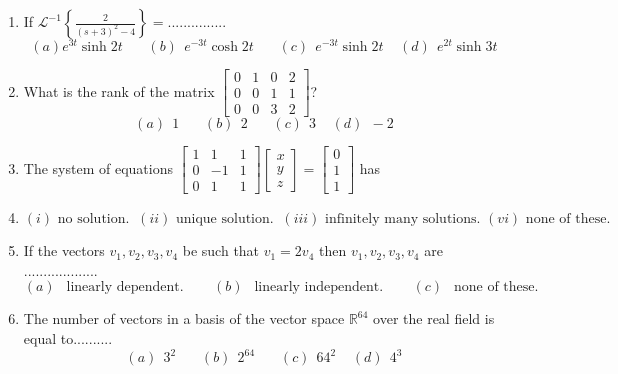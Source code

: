 \documentclass[a4paper,12pt]{article}
\begin{document}
\begin{enumerate}
 \item If ${\mathcal L}^{-1}\left\{\displaystyle\frac{2}{(s+3)^2-4}\right\}=...............$
\vspace{10pt}
  $$(a) e^{3t}\sinh 2t ~~~~~~~~(b)~~e^{-3t}\cosh 2t ~~~~~~~~(c)~~e^{-3t}\sinh 2t ~~~~~(d)~~e^{2t}\sinh 3t $$

 \item What is the rank of the matrix $\begin{bmatrix}
                               0 & 1 & 0 & 2\\ 0 & 0 & 1 & 1\\0 & 0 & 3 & 2
                               \end{bmatrix}$?
 \vspace{10pt}
 $$(a)~~ 1 ~~~~~~~~(b)~~2 ~~~~~~~~(c)~~3 ~~~~~(d)~~-2 $$

\item The system of equations $\begin{bmatrix}
                               1 & 1 & 1\\ 0 & -1 & 1\\0 & 1 & 1
                               \end{bmatrix}\begin{bmatrix}x\\ y\\z
                               \end{bmatrix}=\begin{bmatrix}0 \\ 1\\ 1
                               \end{bmatrix}$ has  \item[] 
                               $$ (i) \text{ no solution. }~(ii) \text{  unique solution. }~(iii) \text{ infinitely many solutions. }
                               (vi) \text{ none of these.}$$
\item If the vectors $v_1,v_2,v_3,v_4$ be such that $v_1=2v_4$ then $v_1,v_2,v_3,v_4$ are ...................
 \vspace{10pt}
 $$(a)~~\text{ linearly dependent. }~~~~~~~~(b)~~\text{ linearly independent. }~~~~~~~~(c)~~\text{ none of these. } $$
\item The number of vectors in a basis of the vector space $\mathbb{R}^{64}$ over the real field is equal to..........
 $$(a)~~ 3^2 ~~~~~~~~(b)~~2^{64} ~~~~~~~~(c)~~64^2 ~~~~~(d)~~4^{3} $$
 \end{enumerate}
\flushright{$\leftarrow$}
\end{document}
